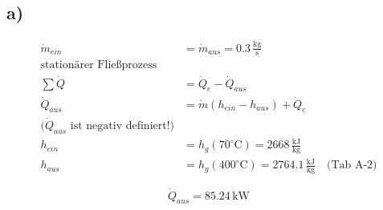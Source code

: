 

\subsection*{a)}
\begin{align*}
\dot{m}_{ein} &= \dot{m}_{aus} = 0.3 \, \frac{\text{kg}}{\text{s}} \\
\text{stationärer Fließprozess} \\
\sum \dot{Q} &= \dot{Q}_e - \dot{Q}_{aus} \\
\dot{Q}_{aus} &= \dot{m} (h_{ein} - h_{aus}) + \dot{Q}_e \\
\text{(}\dot{Q}_{aus} \text{ ist negativ definiert!)} \\
h_{ein} &= h_{g} (70^\circ \text{C}) = 2668 \, \frac{\text{kJ}}{\text{kg}} \\
h_{aus} &= h_{g} (400^\circ \text{C}) = 2764.1 \, \frac{\text{kJ}}{\text{kg}} \quad \text{(Tab A-2)}
\end{align*}

\[
\dot{Q}_{aus} = 85.24 \, \text{kW}
\]